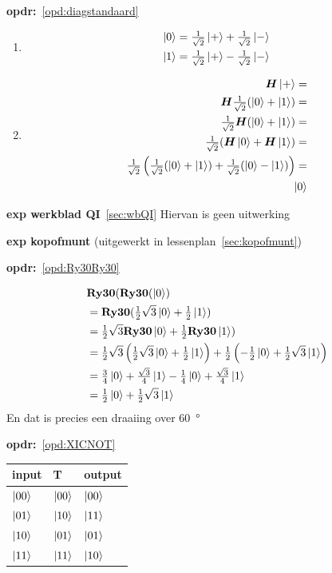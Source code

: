 \documentclass[../../main.tex]{subfiles}
\begin{document}
\textbf{opdr:}~\ref{opd:diagstandaard}
\begin{enumerate}
\item
\[\begin{aligned}
\ket{0}&=\tfrac{1}{\sqrt{2}}\ket{+}+\tfrac{1}{\sqrt{2}}\ket{-}\\
\ket{1}&=\tfrac{1}{\sqrt{2}}\ket{+}-\tfrac{1}{\sqrt{2}}\ket{-}\\
\end{aligned}\]%
\item 
\[\begin{aligned}
\port{$H$}\ket{+}=\\
\port{$H$}\tfrac{1}{\sqrt{2}}(\ket{0}+\ket{1})=\\
\tfrac{1}{\sqrt{2}}\port{$H$}(\ket{0}+\ket{1})=\\
\tfrac{1}{\sqrt{2}}(\port{$H$}\ket{0}+\port{$H$}\ket{1})=\\
\tfrac{1}{\sqrt{2}}\left(\tfrac{1}{\sqrt{2}}(\ket{0}+\ket{1})+\tfrac{1}{\sqrt{2}}(\ket{0}-\ket{1})\right)=\\
\ket{0}
\end{aligned}\]%
\end{enumerate}


\textbf{exp werkblad QI}~\ref{sec:wbQI} Hiervan is geen uitwerking

\textbf{exp kopofmunt} (uitgewerkt in lessenplan~\ref{sec:kopofmunt})

\textbf{opdr:}~\ref{opd:Ry30Ry30}%

\[\begin{aligned}
&\port{Ry30}(\port{Ry30}(\ket{0})\\
&=\port{Ry30}(\tfrac{1}{2}\sqrt{3}\ket{0}+\tfrac{1}{2}\ket{1})\\
&=\tfrac{1}{2}\sqrt{3}\port{Ry30}\ket{0}+\tfrac{1}{2}\port{Ry30}\ket{1})\\
&=\tfrac{1}{2}\sqrt{3}\left(\tfrac{1}{2}\sqrt{3}\ket{0}+\tfrac{1}{2}\ket{1}\right)+\tfrac{1}{2}\left(-\tfrac{1}{2}\ket{0}+\tfrac{1}{2}\sqrt{3}\ket{1}\right)\\
&=\tfrac{3}{4}\ket{0}+\tfrac{\sqrt{3}}{4}\ket{1}-\tfrac{1}{4}\ket{0}+\tfrac{\sqrt{3}}{4}\ket{1}\\
&=\tfrac{1}{2}\ket{0} +\tfrac{1}{2}\sqrt{3}\ket{1}
\end{aligned}\]
En dat is precies een draaiing over \SI{60}{\degree}


\textbf{opdr:}~\ref{opd:XICNOT}%

\begin{tabular}{|l|l|l|}
\hline
input& T \quad & output\\ \hline
$\ket{00}$ &$\ket{00}$ & $\ket{00}$ \\ \hline %
$\ket{01}$ &$\ket{10}$ & $\ket{11}$ \\ \hline %
$\ket{10}$ &$\ket{01}$ & $\ket{01}$ \\ \hline %
$\ket{11}$ &$\ket{11}$ & $\ket{10}$ \\ \hline %
\end{tabular}
\end{document}
